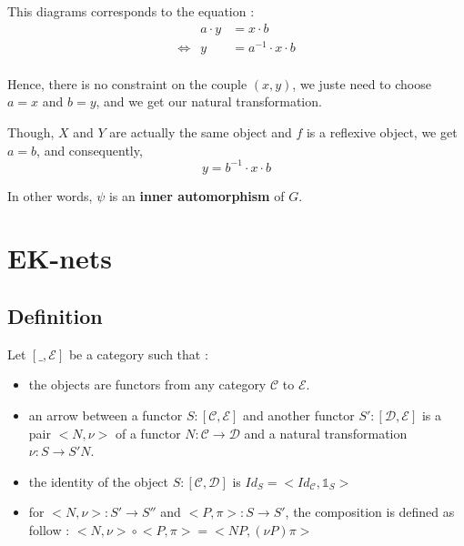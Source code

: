 \documentclass{report}
\begin{document}
This diagrams corresponds to the equation :
\begin{eqnarray*}
    &a\cdot y &= x \cdot b\\
    \Leftrightarrow & y &= a^{-1}\cdot x\cdot  b\\
\end{eqnarray*}

Hence, there is no constraint on the couple $(x,y)$, we juste need to choose $a = x$ and $b = y$, and we get our natural transformation.

Though, $X$ and $Y$ are actually the same object and $f$ is a reflexive object, we get $a = b$, and consequently,
$$y = b^{-1}\cdot x \cdot b $$

In other words, $\psi$ is an \textbf{inner automorphism} of $G$.


\chapter{EK-nets}


\section{Definition}
\begin{defn}
    \label{funcCat}
    Let $[\_,\mathcal{E}]$ be a category such that :
    \begin{itemize}
        \item the objects are functors from any category $\mathcal{C}$ to $\mathcal{E}$.
        \item an arrow between a functor $S : [\mathcal{C},\mathcal{E}]$ and another functor $S' : [\mathcal{D},\mathcal{E}]$ is a pair $\big<N,\nu\big>$ of a functor $N : \mathcal{C}\rightarrow \mathcal{D}$ and a natural transformation $\nu : S \rightarrow S'N$.
        \item the identity of the object $S : [\mathcal{C},\mathcal{D}]$ is $Id_S = \big<Id_\mathcal{C}, \mathds{1}_S\big>$
        \item for $\big<N,\nu\big> : S' \rightarrow S''$ and $\big<P,\pi\big> : S \rightarrow S'$, the composition is defined as follow :
              $\big<N,\nu\big>\circ\big<P,\pi\big> = \big<NP,(\nu P)\pi\big>$
    \end{itemize}
\end{defn}
\end{document}
